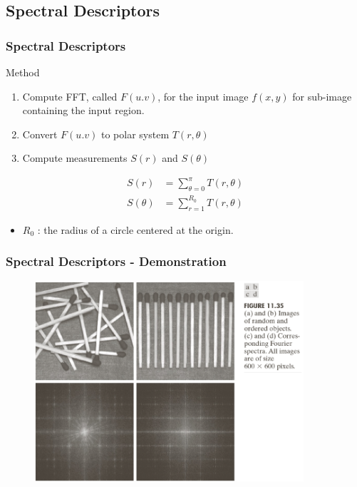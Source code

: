 \documentclass[english,11pt,table,handout]{beamer}
\begin{document}
\subsection{Spectral Descriptors}
\frame
{
	\frametitle{Spectral Descriptors}
	\large
	\begin{block}{Method}
		\begin{enumerate}
			\item Compute FFT, called $F(u.v)$, for the input image $f(x,y)$ for sub-image containing the input region.
			\item Convert $F(u.v)$ to polar system $T(r, \theta)$
			\item Compute measurements $S(r)$ and $S(\theta)$
			
		\end{enumerate}
		\begin{equation}
		\begin{split}
		\nonumber
			S(r) &= \sum_{\theta = 0}^{\pi}{T(r, \theta) } \\
			S(\theta) &= \sum_{r = 1}^{R_0}{T(r, \theta) }
		\end{split}
		\end{equation}
		\begin{itemize}
			\item $R_0$ : the radius of a circle centered at the origin.
		\end{itemize}
	\end{block}
}

\frame
{
	\frametitle{Spectral Descriptors - Demonstration}
	\begin{figure}[!h]
		\includegraphics[width=10cm]{spectral_1.png}
	\end{figure}
}
\end{document}
